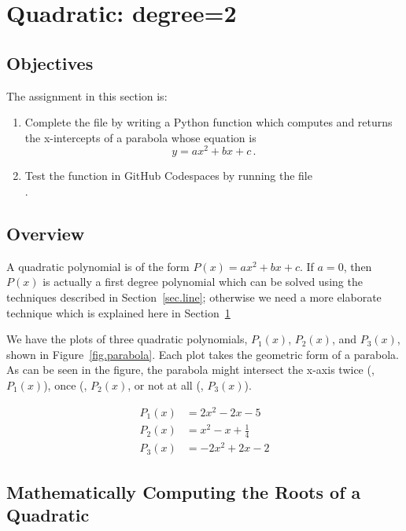 \section{Quadratic: degree=2}
\label{sec.quadratic}

\subsection{Objectives}
The assignment in this section is:
\begin{enumerate}
\item Complete the file  by writing a Python
  function which computes and returns the x-intercepts of a parabola whose
  equation is \[y=a x^2 + b x + c\,.\]
\item Test the function in GitHub Codespaces by running the file\\
  .
\end{enumerate}

\subsection{Overview}



A quadratic polynomial is of the form $P(x)=a x^2 + b x + c$.  If
$a=0$, then $P(x)$ is actually a first degree polynomial which can be
solved using the techniques described in Section~\ref{sec.line};
otherwise we need a more elaborate technique which is explained here in
Section~\ref{sec.quadratic}

We have the plots of three quadratic polynomials, $P_1(x)$, $P_2(x)$,
and $P_3(x)$, shown in Figure~\ref{fig.parabola}.  Each plot takes the
geometric form of a parabola.  As can be seen in the figure, the
parabola might intersect the x-axis twice (\eg, $P_1(x)$), once (\eg,
$P_2(x)$, or not at all (\eg, $P_3(x)$).

\begin{align*}
  P_1(x) &= 2x^2 - 2 x - 5\\
  P_2(x) &= x^2 -x + \frac{1}{4}\\
  P_3(x) &=  -2x^2 + 2x -2
\end{align*}


\subsection{Mathematically Computing the Roots of a Quadratic}

